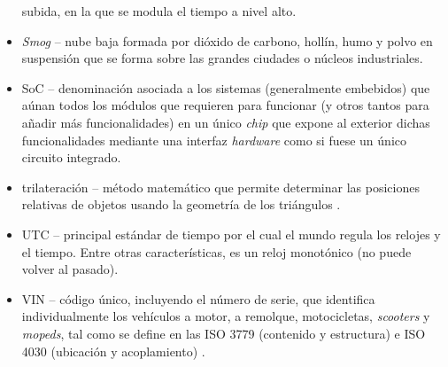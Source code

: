 \begin{itemize}
        subida, en la que se modula el tiempo a nivel alto.
  \item \textit{Smog} -- nube baja formada por dióxido de carbono, hollín, humo y polvo
        en suspensión que se forma sobre las grandes ciudades o núcleos industriales.
  \item \ac{SoC} -- denominación asociada a los sistemas (generalmente embebidos) que
        aúnan todos los módulos que requieren para funcionar (y otros tantos para añadir más
        funcionalidades) en un único \textit{chip} que expone al exterior dichas
        funcionalidades mediante una interfaz \textit{hardware} como si fuese un único
        circuito integrado.
  \item trilateración -- método matemático que permite determinar las posiciones
        relativas de objetos usando la geometría de los triángulos \cite{Trilateracion2021}.
  \item \ac{UTC} -- principal estándar de tiempo por el cual el mundo regula los relojes y el tiempo.
        Entre otras características, es un reloj monotónico (no puede volver al pasado).
  \item \ac{VIN} -- código único, incluyendo el número de serie, que identifica individualmente
        los vehículos a motor, a remolque, motocicletas, \textit{scooters} y \textit{mopeds},
        tal como se define en las ISO 3779 (contenido y estructura) e ISO 4030 (ubicación
        y acoplamiento) \cite{VehicleIdentificationNumber2022}.
\end{itemize}
